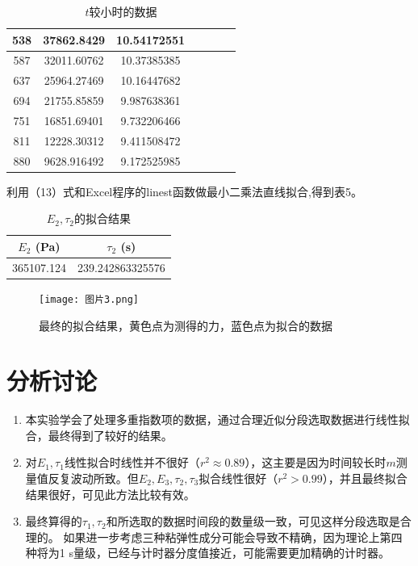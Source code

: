 \documentclass[ctex]{article}
\begin{document}
\begin{table}[H]
\begin{tabular}{|c |c| c| c |c |c| c|}
        538 & 37862.8429 & 10.54172551 \\ \hline
        587 & 32011.60762 & 10.37385385 \\ \hline
        637 & 25964.27469 & 10.16447682 \\ \hline
        694 & 21755.85859 & 9.987638361 \\ \hline
        751 & 16851.69401 & 9.732206466 \\ \hline
        811 & 12228.30312 & 9.411508472 \\ \hline
        880 & 9628.916492 & 9.172525985 \\ \hline
\end{tabular}

    \caption{$t$较小时的数据}
    \label{tab:my_label}
\end{table}
\par 利用（13）式和Excel程序的linest函数做最小二乘法直线拟合,得到表5。
\begin{table}[htbp]
    \centering
    \begin{tabular}{|c|c|}
    \hline
        $E_2$ (Pa)& $\tau_2$ (s)\\ \hline
         365107.124  &239.242863325576   \\ \hline
    \end{tabular}
    \caption{$E_2,\tau_2$的拟合结果}
    \label{tab:my_label}
\end{table}

\begin{figure}[htbp]
    \centering
    \texttt{[image: 图片3.png]}
    \caption{最终的拟合结果，黄色点为测得的力，蓝色点为拟合的数据}
\end{figure} 

\section{分析讨论}
\begin{enumerate}
    \item 本实验学会了处理多重指数项的数据，通过合理近似分段选取数据进行线性拟合，最终得到了较好的结果。
    \item 对$E_1,\tau_1$线性拟合时线性并不很好（$r^2\approx0.89$），这主要是因为时间较长时$m$测量值反复波动所致。但$E_2,E_3,\tau_2,\tau_3$拟合线性很好（$r^2>0.99$），并且最终拟合结果很好，可见此方法比较有效。
    \item 最终算得的$\tau_1,\tau_2$和所选取的数据时间段的数量级一致，可见这样分段选取是合理的。 如果进一步考虑三种粘弹性成分可能会导致不精确，因为理论上第四种将为1 s量级，已经与计时器分度值接近，可能需要更加精确的计时器。
\end{enumerate}
\end{document}
